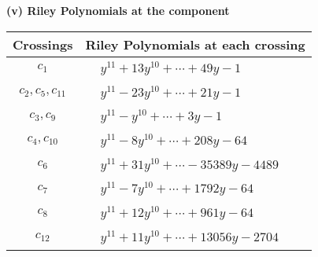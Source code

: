 \documentclass[1p]{elsarticle_modified}
\theoremstyle{definition}
\begin{document}
\newpage\renewcommand{\arraystretch}{1}
\flushleft \textbf{(v) Riley Polynomials at the component}\newline \\
\begin{tabular}{m{50pt}|m{274pt}}
Crossings & \hspace{64pt}Riley Polynomials at each crossing \\
\hline $$\begin{aligned}c_{1}\end{aligned}$$&$\begin{aligned}
&y^{11}+13 y^{10}+\cdots+49 y-1
\end{aligned}$\\
\hline $$\begin{aligned}c_{2},c_{5},c_{11}\end{aligned}$$&$\begin{aligned}
&y^{11}-23 y^{10}+\cdots+21 y-1
\end{aligned}$\\
\hline $$\begin{aligned}c_{3},c_{9}\end{aligned}$$&$\begin{aligned}
&y^{11}- y^{10}+\cdots+3 y-1
\end{aligned}$\\
\hline $$\begin{aligned}c_{4},c_{10}\end{aligned}$$&$\begin{aligned}
&y^{11}-8 y^{10}+\cdots+208 y-64
\end{aligned}$\\
\hline $$\begin{aligned}c_{6}\end{aligned}$$&$\begin{aligned}
&y^{11}+31 y^{10}+\cdots-35389 y-4489
\end{aligned}$\\
\hline $$\begin{aligned}c_{7}\end{aligned}$$&$\begin{aligned}
&y^{11}-7 y^{10}+\cdots+1792 y-64
\end{aligned}$\\
\hline $$\begin{aligned}c_{8}\end{aligned}$$&$\begin{aligned}
&y^{11}+12 y^{10}+\cdots+961 y-64
\end{aligned}$\\
\hline $$\begin{aligned}c_{12}\end{aligned}$$&$\begin{aligned}
&y^{11}+11 y^{10}+\cdots+13056 y-2704
\end{aligned}$\\
\hline
\end{tabular}\\~\\
\end{document}
